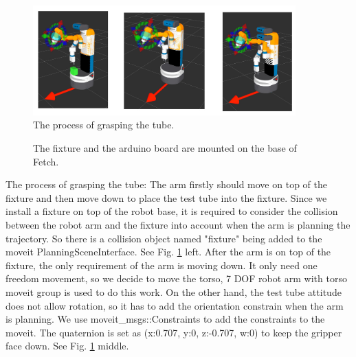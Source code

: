 \documentclass[12pt,draftclsnofoot,onecolumn]{IEEEtran}
\begin{document}
	\begin{figure}[htbp]  %
		\centering
		\includegraphics[width=0.9\textwidth]{img/rviz.jpg}
		\caption{
			The process of grasping the tube.
		}
		\label{rviz}
	\end{figure}
	
	\begin{figure}[b]  %
    \centering
    \caption{The fixture and the arduino board are mounted on the base of Fetch.}
    \label{fixture}
    \end{figure}
    
	The process of grasping the tube:
	The arm firstly should move on top of the fixture and then move down to place the test tube into the fixture.
	Since we install a fixture on top of the robot base, it is required to consider the collision between the robot arm and the fixture into account when the arm is planning the trajectory. So there is a collision object named "fixture" being added to the moveit PlanningSceneInterface. See Fig. \ref{rviz} left.
	After the arm is on top of the fixture, the only requirement of the arm is moving down. It only need one freedom movement, so we decide to move the torso, 7 DOF robot arm with torso moveit group is used to do this work. On the other hand, the test tube attitude does not allow rotation, so it has to add the orientation constrain when the arm is planning. We use moveit\_msgs::Constraints to add the constraints to the moveit. The quaternion is set as (x:0.707, y:0, z:-0.707, w:0) to keep the gripper face down. See Fig. \ref{rviz} middle.
	
\end{document}
